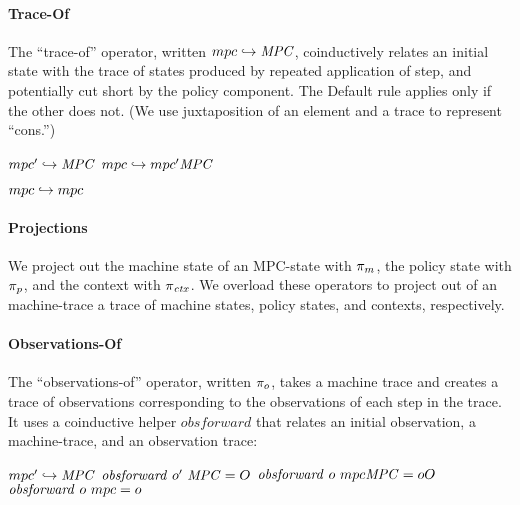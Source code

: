 \documentclass[acmsmall,review,anonymous]{acmart}\settopmatter{printfolios=true,printccs=false,printacmref=false}
\begin{document}
\paragraph*{Trace-Of}

The ``trace-of'' operator, written \(mpc \hookrightarrow \mathit{MPC}\),
coinductively relates an initial state with the trace of states
produced by repeated application of step, and potentially cut short by
the policy component. The {\sc Default} rule applies only if the other does not.
(We use juxtaposition of an element and a trace to represent ``cons.'')

\begin{minipage}{.4\textwidth}
            {\(mpc' \hookrightarrow \mathit{MPC}\)}
            {\(mpc \hookrightarrow mpc' \mathit{MPC}\)}%
\end{minipage}
\begin{minipage}{.4\textwidth}
\judgment[Default]
         {}
         {\(mpc \hookrightarrow mpc\)}
\end{minipage}
%

\paragraph*{Projections}

We project out the machine state of an MPC-state with \(\pi_m\), the
policy state with \(\pi_p\), and the context with \(\pi_{\mathit{ctx}}\). We overload
these operators to project out of an machine-trace a trace of machine states,
policy states, and contexts, respectively.

\paragraph*{Observations-Of}


The ``observations-of'' operator, written \(\pi_o\),  takes a machine trace and
creates a trace of observations corresponding to the observations of each step in
the trace. It uses a coinductive helper \(\mathit{obsforward}\) that relates an
initial observation, a machine-trace, and an observation trace:

              {\(mpc' \hookrightarrow \mathit{MPC}\)}
              {\(\mathit{obsforward} ~ o' ~ \mathit{MPC} = O\)}
              {\(\mathit{obsforward} ~ o ~ mpc \mathit{MPC} = oO\)}%
\judgment{}
         {\(\mathit{obsforward} ~ o ~ mpc = o\)}
\end{document}
